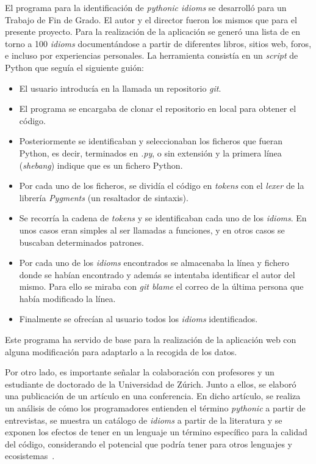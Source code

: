 \documentclass[a4paper, 12pt]{book}
\begin{document}
El programa para la identificación de \textit{pythonic idioms} se desarrolló para un Trabajo de Fin de Grado. El autor y el director fueron los mismos que para el presente proyecto. Para la realización de la aplicación se generó una lista de en torno a 100 \textit{idioms} documentándose a partir de diferentes libros, sitios web, foros, e incluso por experiencias personales. La herramienta consistía en un \textit{script} de Python que seguía el siguiente guión:
\begin{itemize}
    \item El usuario introducía en la llamada un repositorio \textit{git}.
    \item El programa se encargaba de clonar el repositorio en local para obtener el código.
    \item Posteriormente se identificaban y seleccionaban los ficheros que fueran Python, es decir, terminados en \textit{.py}, o sin extensión y la primera línea (\textit{shebang}) indique que es un fichero Python.
    \item Por cada uno de los ficheros, se dividía el código en \textit{tokens} con el \textit{lexer} de la librería \textit{Pygments} (un resaltador de sintaxis).
    \item Se recorría la cadena de \textit{tokens} y se identificaban cada uno de los \textit{idioms}. En unos casos eran simples al ser llamadas a funciones, y en otros casos se buscaban determinados patrones.
    \item Por cada uno de los \textit{idioms} encontrados se almacenaba la línea y fichero donde se habían encontrado y además se intentaba identificar el autor del mismo. Para ello se miraba con \textit{git blame} el correo de la última persona que había modificado la línea.
    \item Finalmente se ofrecían al usuario todos los \textit{idioms} identificados.
\end{itemize}

Este programa ha servido de base para la realización de la aplicación web con alguna modificación para adaptarlo a la recogida de los datos.

Por otro lado, es importante señalar la colaboración con profesores y un estudiante de doctorado de la Universidad de Zúrich. Junto a ellos, se elaboró una publicación de un artículo en una conferencia. En dicho artículo, se realiza un análisis de cómo los programadores entienden el término \textit{pythonic} a partir de entrevistas, se muestra un catálogo de \textit{idioms} a partir de la literatura y se exponen los efectos de tener en un lenguaje un término específico para la calidad del código, considerando el potencial que podría tener para otros lenguajes y ecosistemas~\cite{pythononroad}.
\end{document}
